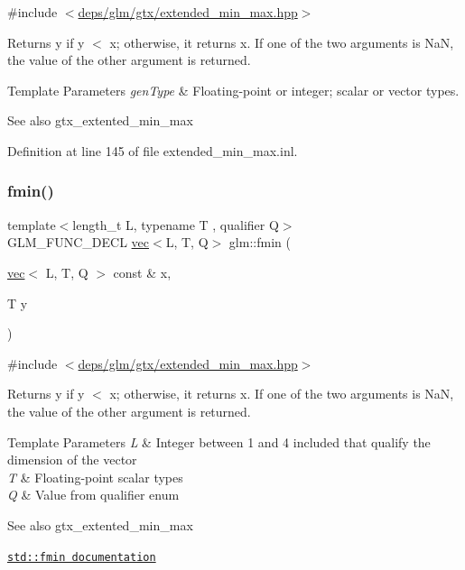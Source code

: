 {\ttfamily \#include $<$\hyperlink{extended__min__max_8hpp}{deps/glm/gtx/extended\+\_\+min\+\_\+max.\+hpp}$>$}

Returns y if y $<$ x; otherwise, it returns x. If one of the two arguments is NaN, the value of the other argument is returned.


\begin{DoxyTemplParams}{Template Parameters}
{\em gen\+Type} & Floating-\/point or integer; scalar or vector types.\\
\hline
\end{DoxyTemplParams}
\begin{DoxySeeAlso}{See also}
gtx\+\_\+extented\+\_\+min\+\_\+max 
\end{DoxySeeAlso}


Definition at line 145 of file extended\+\_\+min\+\_\+max.\+inl.

\mbox{\label{group__gtx__extended__min__max_gae989203363cff9eab5093630df4fe071}} 
\subsubsection{\texorpdfstring{fmin()}{fmin()}\hspace{0.1cm}{\footnotesize\ttfamily [2/3]}}
{\footnotesize\ttfamily template$<$length\+\_\+t L, typename T , qualifier Q$>$ \\
G\+L\+M\+\_\+\+F\+U\+N\+C\+\_\+\+D\+E\+CL \hyperlink{structglm_1_1vec}{vec}$<$L, T, Q$>$ glm\+::fmin (\begin{DoxyParamCaption}\item[{\hyperlink{structglm_1_1vec}{vec}$<$ L, T, Q $>$ const \&}]{x,  }\item[{T}]{y }\end{DoxyParamCaption})}



{\ttfamily \#include $<$\hyperlink{extended__min__max_8hpp}{deps/glm/gtx/extended\+\_\+min\+\_\+max.\+hpp}$>$}

Returns y if y $<$ x; otherwise, it returns x. If one of the two arguments is NaN, the value of the other argument is returned.


\begin{DoxyTemplParams}{Template Parameters}
{\em L} & Integer between 1 and 4 included that qualify the dimension of the vector \\
\hline
{\em T} & Floating-\/point scalar types \\
\hline
{\em Q} & Value from qualifier enum\\
\hline
\end{DoxyTemplParams}
\begin{DoxySeeAlso}{See also}
gtx\+\_\+extented\+\_\+min\+\_\+max 

\href{http://en.cppreference.com/w/cpp/numeric/math/fmin}{\tt std\+::fmin documentation} 
\end{DoxySeeAlso}


